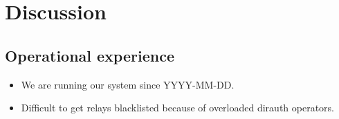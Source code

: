 \section{Discussion}
\label{sec:discussion}

\subsection{Operational experience}
\begin{itemize}
	\item We are running our system since YYYY-MM-DD.
	\item Difficult to get relays blacklisted because of overloaded dirauth operators.
\end{itemize}
